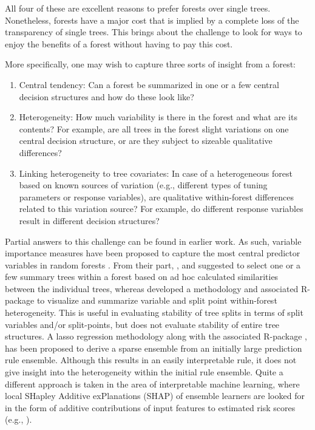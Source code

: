 All four of these are excellent reasons to prefer forests over single trees. Nonetheless, forests have a major cost that is implied by a complete loss of the transparency of single trees. This brings about the challenge to look for ways to enjoy the benefits of a forest without having to pay this cost.

More specifically, one may wish to capture three sorts of insight from a forest:
\begin{enumerate}
\item{Central tendency: Can a forest be summarized in one or a few central decision structures and how do these look like?}
\item{Heterogeneity: How much variability is there in the forest and what are its contents? For example, are all trees in the forest slight variations on one central decision structure, or are they subject to sizeable qualitative differences?}
\item{Linking heterogeneity to tree covariates: In case of a heterogeneous forest based on known sources of variation (e.g., different types of tuning parameters or response variables), are qualitative within-forest differences related to this variation source? For example, do different response variables result in different decision structures?}
\end{enumerate}

Partial answers to this challenge can be found in earlier work. As such, variable importance measures have been proposed to capture the most central predictor variables in random forests \citep{Breiman2001, Breiman2003}. From their part, \citet{Banerjee2012, Briand2009}, and \citet{Chipman1998} suggested to select one or a few summary trees within a forest based on ad hoc calculated similarities between the individual trees, whereas \citet{philipp2016} developed a methodology and associated R-package  to visualize and summarize variable and split point within-forest heterogeneity. This is useful in evaluating stability of tree splits in terms of split variables and/or split-points, but does not evaluate stability of entire tree structures. A lasso regression methodology \citep{Friedman2008} along with the associated R-package  \citep{Fokkema2020}, has been proposed to derive a sparse ensemble from an initially large prediction rule ensemble. Although this results in an easily interpretable rule, it does not give insight into the heterogeneity within the initial rule ensemble. Quite a different approach is taken in the area of interpretable machine learning, where local SHapley Additive exPlanations (SHAP) of ensemble learners are looked for in the form of additive contributions of input features to estimated risk scores (e.g., \citet{Lundberg2020}).

